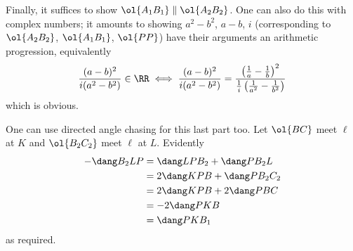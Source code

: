 \documentclass[11pt]{scrartcl}
\begin{document}
Finally, it suffices to show $\ol{A_1B_1} \parallel \ol{A_2B_2}$.
One can also do this with complex numbers;
it amounts to showing $a^2-b^2$, $a-b$, $i$
(corresponding to $\ol{A_2 B_2}$, $\ol{A_1 B_1}$, $\ol{PP}$)
have their arguments an arithmetic progression, equivalently
\[ \frac{(a-b)^2}{i(a^2-b^2)} \in \RR
  \iff
  \frac{(a-b)^2}{i(a^2-b^2)}
  = \frac{\left( \frac 1a-\frac1b \right)^2}
  {\frac1i\left(\frac{1}{a^2}-\frac{1}{b^2}\right)}
\]
which is obvious.
\begin{remark*}
One can use directed angle chasing for this last part too.
Let $\ol{BC}$ meet $\ell$ at $K$ and $\ol{B_2C_2}$ meet $\ell$ at $L$.
Evidently
\begin{align*}
  -\dang B_2LP &= \dang LPB_2 + \dang PB_2L \\
  &= 2 \dang KPB + \dang PB_2C_2 \\
  &= 2 \dang KPB + 2\dang PBC \\
  &= -2\dang PKB \\
  &= \dang PKB_1 \\
\end{align*}
as required.
\end{remark*}
\pagebreak
\end{document}
